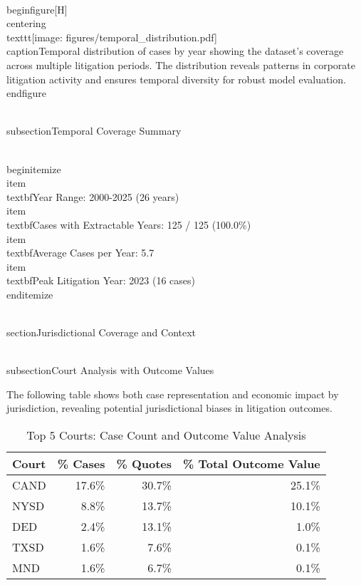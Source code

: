 \documentclass[11pt]{article}
\begin{document}
\\begin{figure}[H]
\\centering
\\texttt{[image: figures/temporal\_distribution.pdf]}
\\caption{Temporal distribution of cases by year showing the dataset's coverage across multiple litigation periods. The distribution reveals patterns in corporate litigation activity and ensures temporal diversity for robust model evaluation.}
\\end{figure}

\\subsection{Temporal Coverage Summary}

\\begin{itemize}
\\item \\textbf{Year Range}: 2000-2025 (26 years)
\\item \\textbf{Cases with Extractable Years}: 125 / 125 (100.0\%)
\\item \\textbf{Average Cases per Year}: 5.7
\\item \\textbf{Peak Litigation Year}: 2023 (16 cases)
\\end{itemize}

\\section{Jurisdictional Coverage and Context}

\\subsection{Court Analysis with Outcome Values}

The following table shows both case representation and economic impact by jurisdiction, revealing potential jurisdictional biases in litigation outcomes.

\begin{table}[H]
\centering
\caption{Top 5 Courts: Case Count and Outcome Value Analysis}
\begin{tabular}{lrrr}
\toprule
\textbf{Court} & \textbf{\% Cases} & \textbf{\% Quotes} & \textbf{\% Total Outcome Value} \\
\midrule
CAND & 17.6\% & 30.7\% & 25.1\% \\
NYSD & 8.8\% & 13.7\% & 10.1\% \\
DED & 2.4\% & 13.1\% & 1.0\% \\
TXSD & 1.6\% & 7.6\% & 0.1\% \\
MND & 1.6\% & 6.7\% & 0.1\% \\

\bottomrule
\end{tabular}
\end{table}
\end{document}
